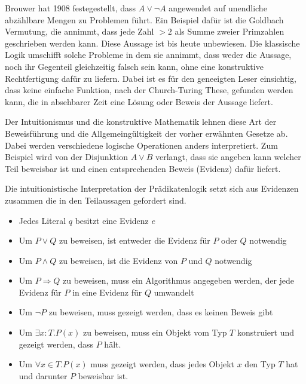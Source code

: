 Brouwer hat 1908 festegestellt, dass $A\vee\neg A$ angewendet auf unendliche
abzählbare Mengen zu Problemen führt. Ein Beispiel dafür ist die Goldbach
Vermutung, die annimmt, dass jede Zahl $> 2$ als Summe zweier Primzahlen
geschrieben werden kann. Diese Aussage ist bis heute unbewiesen. Die klassische
Logik umschifft solche Probleme in dem sie annimmt, dass weder die Aussage, noch 
ihr Gegenteil gleichzeitig falsch sein kann, ohne eine konstruktive
Rechtfertigung dafür zu liefern. Dabei ist es für den geneeigten Leser
einsichtig, dass keine einfache Funktion, nach der Church-Turing These, 
gefunden werden kann, die in absehbarer Zeit eine Lösung oder Beweis der
Aussage liefert.~\cite{sep-logic-intuitionistic, sep-mathematics-constructive}

Der Intuitionismus und die konstruktive Mathematik lehnen diese Art der
Beweisführung und die Allgemeingültigkeit der vorher erwähnten Gesetze ab.
Dabei werden verschiedene logische Operationen anders interpretiert.
Zum Beispiel wird von der Disjunktion $A\vee B$ verlangt, dass sie angeben kann
welcher Teil beweisbar ist und einen entsprechenden Beweis (Evidenz)
dafür liefert.~\cite{kreitz1994automatisierte}

\begin{defi}
  Die intuitionistische Interpretation der Prädikatenlogik setzt sich aus
  Evidenzen zusammen die in den Teilaussagen gefordert sind.
  \begin{itemize}
  \item Jedes Literal $q$ besitzt eine Evidenz $e$
  \item Um $P\vee Q$ zu beweisen, ist entweder die Evidenz für $P$ oder $Q$
    notwendig
  \item Um $P\wedge Q$ zu beweisen, ist die Evidenz von $P$ und $Q$ notwendig
  \item Um $P\Rightarrow Q$ zu beweisen, muss ein Algorithmus angegeben werden, der jede
    Evidenz für $P$ in eine Evidenz für $Q$ umwandelt 
  \item Um $\neg P$ zu beweisen, muss gezeigt werden, dass es keinen Beweis gibt
  \item Um $\exists x:T.P(x)$ zu beweisen, muss ein Objekt vom Typ $T$ konstruiert
    und gezeigt werden, dass $P$ hält.
  \item Um $\forall x\in T.P(x)$ muss gezeigt werden, dass jedes Objekt $x$ den Typ $T$
    hat und darunter $P$ beweisbar ist.
  \end{itemize}
\end{defi}~\cite{sep-mathematics-constructive}

